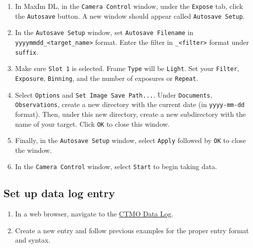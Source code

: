 \documentclass{article}
\begin{document}
		\begin{enumerate}

			\item In MaxIm DL, in the \texttt{Camera Control} window, under the \texttt{Expose} tab, click the \texttt{Autosave} button. A new window should appear called \texttt{Autosave Setup}.

			\item In the \texttt{Autosave Setup} window, set \texttt{Autosave Filename} in \texttt{yyyymmdd\_<target\_name>} format. Enter the filter in \texttt{\_<filter>} format under \texttt{suffix}.

			\item Make sure \texttt{Slot 1} is selected. Frame \texttt{Type} will be \texttt{Light}. Set your \texttt{Filter}, \texttt{Exposure}, \texttt{Binning}, and the number of exposures or \texttt{Repeat}.

			\item Select \texttt{Options} and \texttt{Set Image Save Path...}. Under \texttt{Documents}, \texttt{Observations}, create a new directory with the current date (in \texttt{yyyy-mm-dd} format). Then, under this new directory, create a new subdirectory with the name of your target. Click \texttt{OK} to close this window.

			\item Finally, in the \texttt{Autosave Setup} window, select \texttt{Apply} followed by \texttt{OK} to close the window.

			\item In the \texttt{Camera Control} window, select \texttt{Start} to begin taking data.

		\end{enumerate}

	\subsection{Set up data log entry}

		\begin{enumerate}

			\item In a web browser, navigate to the \href{https://docs.google.com/spreadsheets/d/1-flrFYcHwpuXavXAMwkF41ibTWqWWC0Sgsv5X402HyY/edit?usp=sharing}{CTMO Data Log}.

			\item Create a new entry and follow previous examples for the proper entry format and syntax.

		\end{enumerate}
\end{document}
